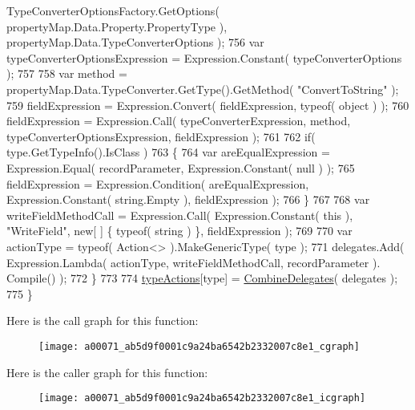 \begin{DoxyCode}
      TypeConverterOptionsFactory.GetOptions( propertyMap.Data.Property.PropertyType ), propertyMap.Data.TypeConverterOptions );
756                 var typeConverterOptionsExpression = Expression.Constant( typeConverterOptions );
757 
758                 var method = propertyMap.Data.TypeConverter.GetType().GetMethod( \textcolor{stringliteral}{"ConvertToString"} );
759                 fieldExpression = Expression.Convert( fieldExpression, typeof( \textcolor{keywordtype}{object} ) );
760                 fieldExpression = Expression.Call( typeConverterExpression, method, 
      typeConverterOptionsExpression, fieldExpression );
761 
762                 \textcolor{keywordflow}{if}( type.GetTypeInfo().IsClass )
763                 \{
764                     var areEqualExpression = Expression.Equal( recordParameter, Expression.Constant( null )
       );
765                     fieldExpression = Expression.Condition( areEqualExpression, Expression.Constant( 
      string.Empty ), fieldExpression );
766                 \}
767 
768                 var writeFieldMethodCall = Expression.Call( Expression.Constant( this ), \textcolor{stringliteral}{"WriteField"}, \textcolor{keyword}{new}[
      ] \{ typeof( \textcolor{keywordtype}{string} ) \}, fieldExpression );
769 
770                 var actionType = typeof( Action<> ).MakeGenericType( type );
771                 delegates.Add( Expression.Lambda( actionType, writeFieldMethodCall, recordParameter ).
      Compile() );
772             \}
773 
774             \hyperlink{a00071_a93af56d83ee3a76d1d3ce39f9c344d15}{typeActions}[type] = \hyperlink{a00071_ab6cbf58f5e59e5d6091a89e4e778f11b}{CombineDelegates}( delegates );
775         \}
\end{DoxyCode}


Here is the call graph for this function\-:
\nopagebreak
\begin{figure}[H]
\begin{center}
\leavevmode
\texttt{[image: a00071\_ab5d9f0001c9a24ba6542b2332007c8e1\_cgraph]}
\end{center}
\end{figure}




Here is the caller graph for this function\-:
\nopagebreak
\begin{figure}[H]
\begin{center}
\leavevmode
\texttt{[image: a00071\_ab5d9f0001c9a24ba6542b2332007c8e1\_icgraph]}
\end{center}
\end{figure}


